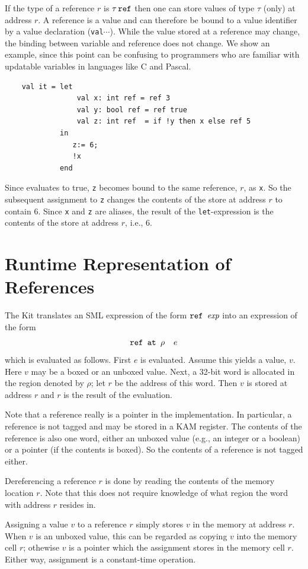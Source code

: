 \documentclass[12pt]{book}
\begin{document}
\noindent
If the type
of a reference $r$ 
is $\tau\,\hbox{\tt ref}$ then one can store values of type $\tau$ (only)
at address $r$. 
A reference is a value and can therefore be bound to a value identifier
by a value declaration ({\tt val}$\cdots$). While the
value stored at a reference may change, the binding between variable
and reference does not change. We show an example,
since this point can be confusing to programmers who are familiar with
updatable variables in languages like C and Pascal.
\begin{verbatim}
    val it = let
                 val x: int ref = ref 3
                 val y: bool ref = ref true
                 val z: int ref  = if !y then x else ref 5
             in 
                z:= 6;
                !x
             end
\end{verbatim}
Since  evaluates to true, {\tt z} becomes bound
to the same reference, $r$,  as {\tt x}. 
So the subsequent assignment to {\tt z} 
changes the contents of the store at address $r$
to contain 6. Since {\tt x} and {\tt z} are aliases, the
result of the {\tt let}-expression is the contents of the store
at address $r$, i.e., 6.

\section{Runtime Representation of References}
The Kit translates an 
SML expression of the form $\hbox{\tt ref $\hbox{\it exp}$}$ into
an expression of the form
$$\hbox{\tt ref at $\rho\quad e$}$$
which is evaluated as follows. First $e$ is evaluated. Assume
this yields a value, $v$. Here $v$ may be a boxed 
or an unboxed value.
Next, a 32-bit word is allocated in the region denoted by $\rho$;
let $r$ be the address of this word. Then $v$ is stored at
address $r$ and $r$ is the result of the evaluation.

Note that a reference really is a pointer in the implementation. 
In particular,
a reference is not tagged and may  be stored
in a KAM register. The contents
of the reference is also one word, either an unboxed value (e.g., 
an integer or a boolean) or a pointer (if the contents is boxed). 
So the contents of a reference is not tagged either.

Dereferencing a reference $r$ 
is done by reading the contents of the memory location $r$.
Note that this does not require knowledge of what region the word
with address $r$ resides in.

Assigning a value $v$ to a reference $r$ simply stores $v$ in the
memory at address $r$. When $v$ is an unboxed value, this can be
regarded as copying $v$ into the memory cell $r$; othewise $v$ is
a pointer which the assignment stores in the memory cell $r$. Either
way, assignment is a constant-time operation.
\end{document}
